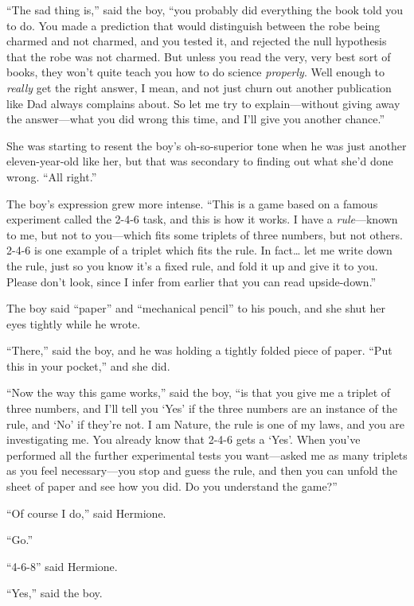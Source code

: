 ``The sad thing is,'' said the boy, ``you probably did everything the
book told you to do. You made a prediction that would distinguish
between the robe being charmed and not charmed, and you tested it, and
rejected the null hypothesis that the robe was not charmed. But unless
you read the very, very best sort of books, they won't quite teach you
how to do science \emph{properly}. Well enough to \emph{really} get the
right answer, I mean, and not just churn out another publication like
Dad always complains about. So let me try to explain---without giving
away the answer---what you did wrong this time, and I'll give you
another chance.''

She was starting to resent the boy's oh-so-superior tone when he was
just another eleven-year-old like her, but that was secondary to finding
out what she'd done wrong. ``All right.''

The boy's expression grew more intense. ``This is a game based on a
famous experiment called the 2-4-6 task, and this is how it works. I
have a \emph{rule}---known to me, but not to you---which fits some
triplets of three numbers, but not others. 2-4-6 is one example of a
triplet which fits the rule. In fact\ldots{} let me write down the rule,
just so you know it's a fixed rule, and fold it up and give it to you.
Please don't look, since I infer from earlier that you can read
upside-down.''

The boy said ``paper'' and ``mechanical pencil'' to his pouch, and she
shut her eyes tightly while he wrote.

``There,'' said the boy, and he was holding a tightly folded piece of
paper. ``Put this in your pocket,'' and she did.

``Now the way this game works,'' said the boy, ``is that you give me a
triplet of three numbers, and I'll tell you `Yes' if the three numbers
are an instance of the rule, and `No' if they're not. I am Nature, the
rule is one of my laws, and you are investigating me. You already know
that 2-4-6 gets a `Yes'. When you've performed all the further
experimental tests you want---asked me as many triplets as you feel
necessary---you stop and guess the rule, and then you can unfold the
sheet of paper and see how you did. Do you understand the game?''

``Of course I do,'' said Hermione.

``Go.''

``4-6-8'' said Hermione.

``Yes,'' said the boy.

